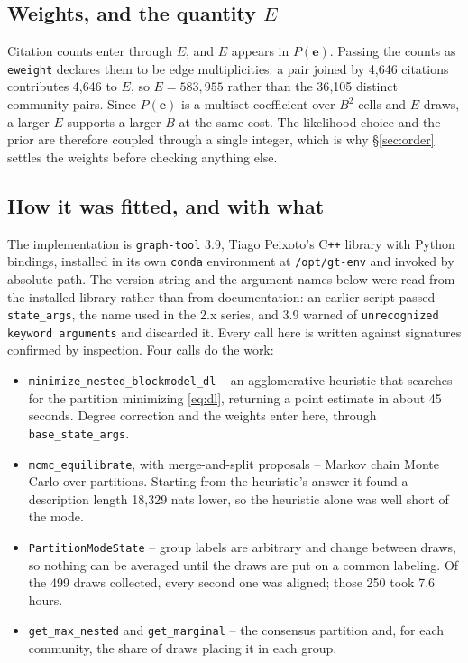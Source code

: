 \documentclass[11pt]{article}
\newcommand{\code}[1]{\texttt{\small #1}}
\begin{document}
\subsection{Weights, and the quantity $E$}
\label{sec:weights}

Citation counts enter through $E$, and $E$ appears in $P(\bm{e})$. Passing the
counts as \code{eweight} declares them to be edge multiplicities: a pair joined
by 4{,}646 citations contributes 4{,}646 to $E$, so $E = 583{,}955$ rather
than the 36{,}105 distinct community pairs. Since $P(\bm{e})$ is a multiset
coefficient over $B^2$ cells and $E$ draws, a larger $E$ supports a larger $B$
at the same cost. The likelihood choice and the prior are therefore coupled
through a single integer, which is why \S\ref{sec:order} settles the weights
before checking anything else.

\subsection{How it was fitted, and with what}

The implementation is \code{graph-tool} 3.9, Tiago Peixoto's C\texttt{++}
library with Python bindings, installed in its own \code{conda} environment at
\code{/opt/gt-env} and invoked by absolute path. The version string and the
argument names below were read from the installed library rather than from
documentation: an earlier script passed \code{state_args}, the name used in
the 2.x series, and 3.9 warned of \code{unrecognized keyword arguments} and
discarded it. Every call here is written against signatures confirmed
by inspection. Four calls do the work:

\begin{itemize}[leftmargin=1.5em, itemsep=0.3em]
\item \code{minimize_nested_blockmodel_dl} -- an agglomerative heuristic that
  searches for the partition minimizing \eqref{eq:dl}, returning a point
  estimate in about 45 seconds. Degree correction and the weights enter here,
  through \code{base_state_args}.
\item \code{mcmc_equilibrate}, with merge-and-split proposals -- Markov chain
  Monte Carlo over partitions. Starting from the heuristic's answer it found a
  description length 18{,}329 nats lower, so the heuristic alone was well short
  of the mode.
\item \code{PartitionModeState} -- group labels are arbitrary and change
  between draws, so nothing can be averaged until the draws are put on a common
  labeling. Of the 499 draws collected, every second one was aligned; those
  250 took 7.6 hours.
\item \code{get_max_nested} and \code{get_marginal} -- the consensus partition
  and, for each community, the share of draws placing it in each group.
\end{itemize}
\end{document}
